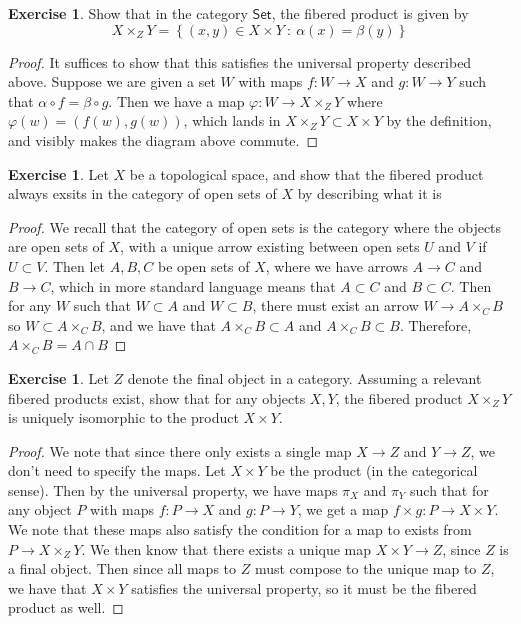 \documentclass[psamsfonts]{amsart}
\theoremstyle{definition}
\newtheorem{exer}[thm]{Exercise}
\theoremstyle{remark}
\newcommand{\set}[1]{\left\lbrace #1 \right\rbrace}
\begin{document}
%
\begin{exer}
Show that in the category $\mathsf{Set}$, the fibered product is given by
$$X \times_Z Y = \set{(x,y) \in X \times Y ~:~ \alpha(x) = \beta(y)} $$
\end{exer}
%
\begin{proof}
It suffices to show that this satisfies the universal property described above. Suppose we are given a set $W$ with maps $f: W \to X$ and $g: W \to Y$ such that $\alpha \circ f = \beta \circ g$. Then we have a map $\varphi: W \to X\times_Z Y$ where $\varphi(w) = (f(w),g(w))$, which lands in $X \times_Z Y \subset X \times Y$ by the definition, and visibly makes the diagram above commute.
\end{proof}
%
\begin{exer}
Let $X$ be a topological space, and show that the fibered product always exsits in the category of open sets of $X$ by describing what it is
\end{exer}
%
\begin{proof}
We recall that the category of open sets is the category where the objects are open sets of $X$, with a unique arrow existing between open sets $U$ and $V$ if $U \subset V$. Then let $A,B,C$ be open sets of $X$, where we have arrows $A \to C$ and $B \to C$, which in more standard language means that $A \subset C$ and $B \subset C$. Then for any $W$ such that $W \subset A$ and $W \subset B$, there must exist an arrow $W \to A \times_C B$ so $W \subset A \times_C B$, and we have that $A \times_C B \subset A$ and $A \times_C B \subset B$. Therefore, $A \times_C B = A \cap B$
\end{proof}
%
\begin{exer}
Let $Z$ denote the final object in a category. Assuming a relevant fibered products exist, show that for any objects $X,Y$, the fibered product $X \times_Z Y$ is uniquely isomorphic to the product $X \times Y$.
\end{exer}
%
\begin{proof}
We note that since there only exists a single map $X \to Z$ and $Y \to Z$, we don't need to specify the maps. Let $X \times Y$ be the product (in the categorical sense). Then by the universal property, we have maps $\pi_X$ and $\pi_Y$ such that for any object $P$ with maps $f: P \to X$ and $g: P \to Y$, we get a map $f \times g: P \to X \times Y$. We note that these maps also satisfy the condition for a map to exists from $P \to X \times_Z Y$. We then know that there exists a unique map $X \times Y \to Z$, since $Z$ is a final object. Then since all maps to $Z$ must compose to the unique map to $Z$, we have that $X \times Y$ satisfies the universal property, so it must be the fibered product as well.
\end{proof}
\end{document}
